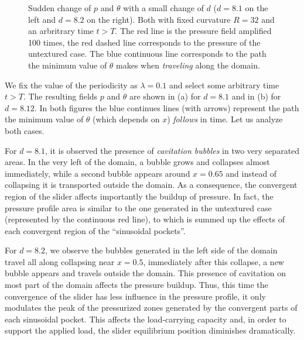 \begin{figure}[ht]
 \centering 
 \def\svgwidth{\textwidth}	
 \scriptsize{
}
\caption[Sudden change of $p$ and $\theta$ with a small change of $d$ and $\lambda$ fixed]{Sudden change of $p$ and $\theta$ with a small change of $d$ ($d=8.1$ on the left and $d=8.2$ on the right). Both with fixed curvature $R=32$ and an arbritrary time $t>T$. The red line is the pressure field amplified 100 times, the red dashed line corresponds to the pressure of the untextured case. The blue continuous line corresponds to the path the minimum value of $\theta$ makes when \emph{traveling} along the domain.}\label{fig:chap6_varying_d_r32}
\end{figure}

We fix the value of the periodicity as $\lambda=0.1$ and select some arbitrary time $t>T$. The resulting fields $p$ and $\theta$ are shown in (a) for $d=8.1$ and in (b) for $d=8.12$. In both figures the blue continues lines (with arrows) represent the path the minimum value of $\theta$ (which depends on $x$) \emph{follows} in time. Let us analyze both cases.

For $d=8.1$, it is observed the presence of \emph{cavitation bubbles} in two very separated areas. In the very left of the domain, a bubble grows and collapses almost immediately, while a second bubble appears around $x=0.65$ and instead of collapsing it is transported outside the domain. As a consequence, the convergent region of the slider affects importantly the buildup of pressure. In fact, the pressure profile area is similar to the one generated in the untextured case (represented by the continuous red line), to which is summed up the effects of each convergent region of the ``sinusoidal pockets''.

For $d=8.2$, we observe the bubbles generated in the left side of the domain travel all along collapsing near $x=0.5$, immediately after this collapse, a new bubble appears and travels outside the domain. This presence of cavitation on most part of the domain affects the pressure buildup. Thus, this time the convergence of the slider has less influence in the pressure profile, it only modulates the peak of the pressurized zones generated by the convergent parts of each sinusoidal pocket. This affects the load-carrying capacity and, in order to support the applied load, the slider equilibrium position diminishes dramatically.

